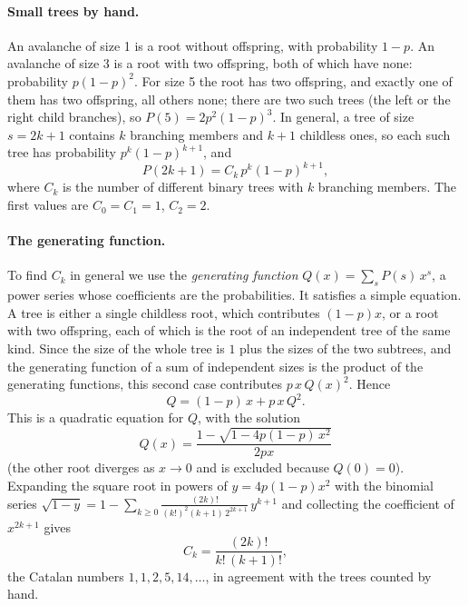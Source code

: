 \paragraph{Small trees by hand.} An avalanche of size 1 is a root without offspring, with probability $1-p$. An avalanche of size 3 is a root
with two offspring, both of which have none: probability $p(1-p)^2$. For size 5 the root has two offspring, and exactly one of them has two
offspring, all others none; there are two such trees (the left or the right child branches), so $P(5) = 2p^2(1-p)^3$. In general, a tree of size
$s = 2k+1$ contains $k$ branching members and $k+1$ childless ones, so each such tree has probability $p^k(1-p)^{k+1}$, and
\begin{equation}
  P(2k+1) = C_k\,p^k(1-p)^{k+1},
\end{equation}
where $C_k$ is the number of different binary trees with $k$ branching members. The first values are $C_0 = C_1 = 1$, $C_2 = 2$.

\paragraph{The generating function.} To find $C_k$ in general we use the \emph{generating function} $Q(x) = \sum_s P(s)\,x^s$, a power series
whose coefficients are the probabilities. It satisfies a simple equation. A tree is either a single childless root, which contributes $(1-p)x$,
or a root with two offspring, each of which is the root of an independent tree of the same kind. Since the size of the whole tree is $1$ plus the
sizes of the two subtrees, and the generating function of a sum of independent sizes is the product of the generating functions, this second case
contributes $p\,x\,Q(x)^2$. Hence
\begin{equation}
  Q = (1-p)\,x + p\,x\,Q^2 .
\end{equation}
This is a quadratic equation for $Q$, with the solution
\begin{equation}
  Q(x) = \frac{1 - \sqrt{1-4p(1-p)\,x^2}}{2px}
\end{equation}
(the other root diverges as $x\to0$ and is excluded because $Q(0) = 0$). Expanding the square root in powers of $y = 4p(1-p)x^2$ with the binomial
series $\sqrt{1-y} = 1-\sum_{k\ge0}\frac{(2k)!}{(k!)^2(k+1)\,2^{2k+1}}\,y^{k+1}$ and collecting the coefficient of $x^{2k+1}$ gives
\begin{equation}
  C_k = \frac{(2k)!}{k!\,(k+1)!},
  \label{eq:catalan}
\end{equation}
the Catalan numbers $1,1,2,5,14,\dots$, in agreement with the trees counted by hand.

